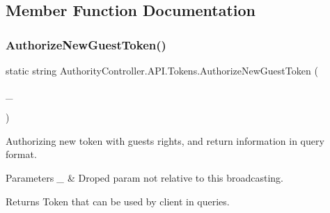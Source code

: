 \subsection{Member Function Documentation}
\mbox{\label{class_authority_controller_1_1_a_p_i_1_1_tokens_a8b153378b97af2634e8dab9ff1fa48a5}} 
\subsubsection{\texorpdfstring{Authorize\+New\+Guest\+Token()}{AuthorizeNewGuestToken()}\hspace{0.1cm}{\footnotesize\ttfamily [1/2]}}
{\footnotesize\ttfamily static string Authority\+Controller.\+A\+P\+I.\+Tokens.\+Authorize\+New\+Guest\+Token (\begin{DoxyParamCaption}\item[{\mbox{\hyperlink{class_pipes_provider_1_1_server_1_1_transmission_controllers_1_1_broadcasting_server_transmission_controller}{Pipes\+Provider.\+Server.\+Transmission\+Controllers.\+Broadcasting\+Server\+Transmission\+Controller}}}]{\+\_\+ }\end{DoxyParamCaption})\hspace{0.3cm}{\ttfamily [static]}}



Authorizing new token with guest\textquotesingle{}s rights, and return information in query format. 


\begin{DoxyParams}{Parameters}
{\em \+\_\+} & Droped param not relative to this broadcasting.\\
\hline
\end{DoxyParams}
\begin{DoxyReturn}{Returns}
Token that can be used by client in queries.
\end{DoxyReturn}
\mbox{\label{class_authority_controller_1_1_a_p_i_1_1_tokens_a0ba1c2d69ffbc73d78b7b16735f7fb5a}} 
